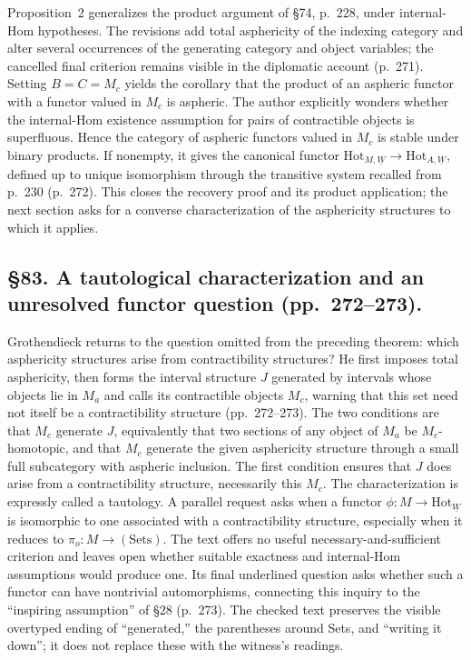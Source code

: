 \documentclass[10pt,oneside]{book}
\begin{document}
Proposition~2 generalizes the product argument of \S74, p.\ 228, under internal-Hom hypotheses. The revisions add total asphericity of the indexing category and alter several occurrences of the generating category and object variables; the cancelled final criterion remains visible in the diplomatic account (p.\ 271). Setting $B=C=M_c$ yields the corollary that the product of an aspheric functor with a functor valued in $M_c$ is aspheric. The author explicitly wonders whether the internal-Hom existence assumption for pairs of contractible objects is superfluous. Hence the category of aspheric functors valued in $M_c$ is stable under binary products. If nonempty, it gives the canonical functor $\mathrm{Hot}_{M,\underline W}\to\mathrm{Hot}_{A,\underline W}$, defined up to unique isomorphism through the transitive system recalled from p.\ 230 (p.\ 272). This closes the recovery proof and its product application; the next section asks for a converse characterization of the asphericity structures to which it applies.

\subsection*{\S83. A tautological characterization and an unresolved functor question (pp.\ 272--273).}
Grothendieck returns to the question omitted from the preceding theorem: which asphericity structures arise from contractibility structures? He first imposes total asphericity, then forms the interval structure $J$ generated by intervals whose objects lie in $M_a$ and calls its contractible objects $M_c$, warning that this set need not itself be a contractibility structure (pp.\ 272--273). The two conditions are that $M_c$ generate $J$, equivalently that two sections of any object of $M_a$ be $M_c$-homotopic, and that $M_c$ generate the given asphericity structure through a small full subcategory with aspheric inclusion. The first condition ensures that $J$ does arise from a contractibility structure, necessarily this $M_c$. The characterization is expressly called a tautology. A parallel request asks when a functor $\phi:M\to\mathrm{Hot}_{\underline W}$ is isomorphic to one associated with a contractibility structure, especially when it reduces to $\pi_o:M\to(\mathrm{Sets})$. The text offers no useful necessary-and-sufficient criterion and leaves open whether suitable exactness and internal-Hom assumptions would produce one. Its final underlined question asks whether such a functor can have nontrivial automorphisms, connecting this inquiry to the “inspiring assumption” of \S28 (p.\ 273). The checked text preserves the visible overtyped ending of “generated,” the parentheses around Sets, and “writing it down”; it does not replace these with the witness's readings.
\end{document}
